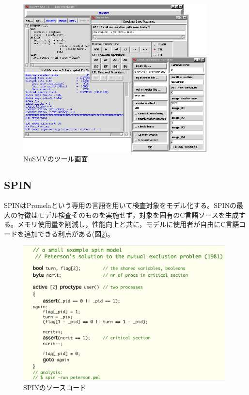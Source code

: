 \documentclass{tpu-sotu}
\begin{document}
	\begin{figure}[htbp]
	\centering
	\includegraphics[width=100mm]{NuSMV.png}
	\caption{NuSMVのツール画面\cite{n2}}
	\label{NuSMV}
	\end{figure}
	\subsection{SPIN}
	SPINはPromelaという専用の言語を用いて検査対象をモデル化する。SPINの最大の特徴はモデル検査そのものを実施せず，対象を固有のC言語ソースを生成する。メモリ使用量を削減し，性能向上と共に，モデルに使用者が自由にC言語コードを追加できる利点がある(図\ref{SPIN})。
		
	\begin{figure}[htbp]
	\centering
	\includegraphics[width=110mm]{SPIN.png}
	\caption{SPINのソースコード\cite{s2}}
	\label{SPIN}
	\end{figure}
\end{document}

